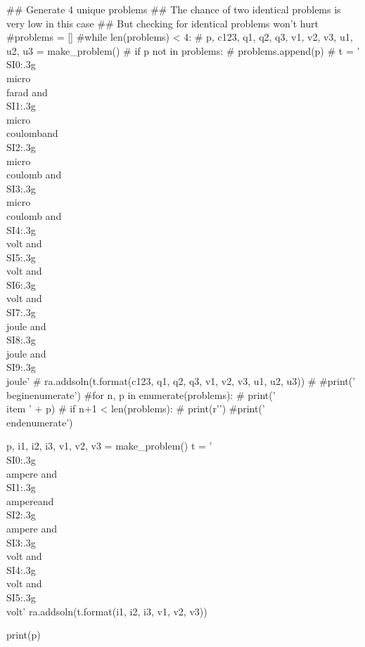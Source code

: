 \documentclass[12pt]{exam}
\begin{document}
\begin{questions}
\begin{pycode}
## Generate 4 unique problems
## The chance of two identical problems is very low in this case
## But checking for identical problems won't hurt
#problems = []
#while len(problems) < 4:
#    p, c123, q1, q2, q3, v1, v2, v3, u1, u2, u3 = make_problem()
#    if p not in problems:
#        problems.append(p)
#        t = '\\SI{{{0:.3g}}}{{\\micro\\farad}} and \\SI{{{1:.3g}}}{{\\micro\\coulomb}}and \\SI{{{2:.3g}}}{{\\micro\\coulomb}} and \\SI{{{3:.3g}}}{{\\micro\\coulomb}} and \\SI{{{4:.3g}}}{{\\volt}} and \\SI{{{5:.3g}}}{{\\volt}} and \\SI{{{6:.3g}}}{{\\volt}} and \\SI{{{7:.3g}}}{{\\joule}} and \\SI{{{8:.3g}}}{{\\joule}} and \\SI{{{9:.3g}}}{{\\joule}}'
#        ra.addsoln(t.format(c123, q1, q2, q3, v1, v2, v3, u1, u2, u3))
#
#print('\\begin{enumerate}')
#for n, p in enumerate(problems):
#    print('\\item ' + p)
#    if n+1 < len(problems):
#        print(r'\vspace{1in}')
#print('\\end{enumerate}')

p, i1, i2, i3, v1, v2, v3 = make_problem()
t = '\\SI{{{0:.3g}}}{{\\ampere}} and \\SI{{{1:.3g}}}{{\\ampere}}and \\SI{{{2:.3g}}}{{\\ampere}} and \\SI{{{3:.3g}}}{{\\volt}} and \\SI{{{4:.3g}}}{{\\volt}} and \\SI{{{5:.3g}}}{{\\volt}}'
ra.addsoln(t.format(i1, i2, i3, v1, v2, v3))

print(p)

\end{pycode}

\end{questions}
	
\end{document}
